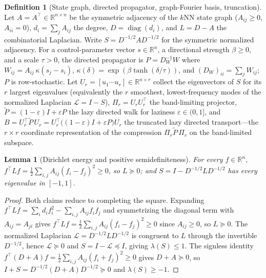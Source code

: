 \documentclass[aps,prresearch,reprint,amsmath,amssymb,nofootinbib,superscriptaddress,floatfix]{revtex4-2}
\newtheorem{lemma}[theorem]{Lemma}
\theoremstyle{definition}
\newtheorem{definition}[theorem]{Definition}
\theoremstyle{remark}
\theoremstyle{plain}
\begin{document}
\begin{definition}[State graph, directed propagator, graph-Fourier basis, truncation]
\label{def:graph}
Let $A=A^\top\in\mathbb{R}^{n\times n}$ be the symmetric adjacency of the $k$NN state graph ($A_{ij}\ge0$,
$A_{ii}=0$), $d_i=\sum_j A_{ij}$ the degree, $D=\operatorname{diag}(d_i)$, and $L=D-A$ the combinatorial
Laplacian. Write $S=D^{-1/2}AD^{-1/2}$ for the symmetric normalized adjacency. For a control-parameter
vector $s\in\mathbb{R}^n$, a directional strength $\beta\ge0$, and a scale $\tau>0$, the directed
propagator is $P=D_W^{-1}W$ where $W_{ij}=A_{ij}\,\kappa(s_j-s_i)$,
$\kappa(\delta)=\exp(\beta\tanh(\delta/\tau))$, and $(D_W)_{ii}=\sum_j W_{ij}$; $P$ is row-stochastic. Let
$U_r=[u_1\cdots u_r]\in\mathbb{R}^{n\times r}$ collect the eigenvectors of $S$ for its $r$ largest
eigenvalues (equivalently the $r$ smoothest, lowest-frequency modes of the normalized Laplacian
$\mathcal L=I-S$), $\Pi_r=U_rU_r^\top$ the band-limiting projector,
$\widetilde P=(1-\varepsilon)I+\varepsilon P$ the lazy directed walk for laziness $\varepsilon\in(0,1]$,
and $B=U_r^\top\widetilde P\,U_r=U_r^\top\!\big((1-\varepsilon)I+\varepsilon P\big)U_r$ the truncated lazy
directed transport---the $r\times r$ coordinate representation of the compression $\Pi_r\widetilde P\,\Pi_r$
on the band-limited subspace.
\end{definition}

\begin{lemma}[Dirichlet energy and positive semidefiniteness]
\label{lem:dirichlet}
For every $f\in\mathbb{R}^{n}$, $f^\top L f=\tfrac12\sum_{i,j} A_{ij}(f_i-f_j)^2\ge0$, so $L\succeq0$; and
$S=I-D^{-1/2}LD^{-1/2}$ has every eigenvalue in $[-1,1]$.
\end{lemma}
\begin{proof}
Both claims reduce to completing the square. Expanding $f^\top Lf=\sum_i d_i f_i^2-\sum_{i,j}A_{ij}f_if_j$
and symmetrizing the diagonal term with $A_{ij}=A_{ji}$ gives
$f^\top Lf=\tfrac12\sum_{i,j}A_{ij}(f_i-f_j)^2\ge0$ since $A_{ij}\ge0$, so $L\succeq0$. The normalized
Laplacian $\mathcal L=D^{-1/2}LD^{-1/2}$ is congruent to $L$ through the invertible $D^{-1/2}$, hence
$\mathcal L\succeq0$ and $S=I-\mathcal L\preceq I$, giving $\lambda(S)\le1$. The signless identity
$f^\top(D+A)f=\tfrac12\sum_{i,j}A_{ij}(f_i+f_j)^2\ge0$ gives $D+A\succeq0$, so
$I+S=D^{-1/2}(D+A)D^{-1/2}\succeq0$ and $\lambda(S)\ge-1$.
\end{proof}
\end{document}
